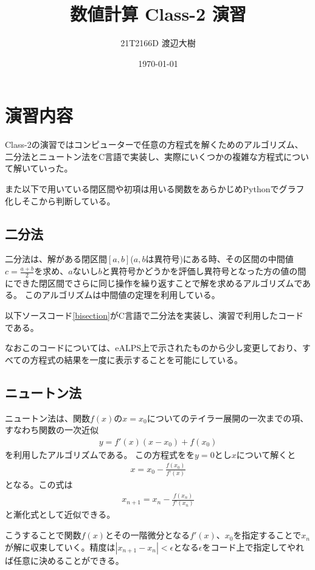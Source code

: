 \documentclass[a4paper,11pt]{jsarticle}
\begin{document}
\title{数値計算 Class-2 演習}
\author{21T2166D 渡辺大樹}
\date{\today}
\maketitle
\section{演習内容}
Class-2の演習ではコンピューターで任意の方程式を解くためのアルゴリズム、二分法とニュートン法をC言語で実装し、実際にいくつかの複雑な方程式について解いていった。

また以下で用いている閉区間や初項は用いる関数をあらかじめPythonでグラフ化しそこから判断している。
    \subsection{二分法}
    二分法は、解がある閉区間$[a,b]$($a,b$は異符号)にある時、その区間の中間値$c=\frac{a+b}{2}$を求め、$a$ないし$b$と異符号かどうかを評価し異符号となった方の値の間にできた閉区間でさらに同じ操作を繰り返すことで解を求めるアルゴリズムである。
    このアルゴリズムは中間値の定理を利用している。
    
    以下ソースコード\ref{bisection}がC言語で二分法を実装し、演習で利用したコードである。
    

    なおこのコードについては、eALPS上で示されたものから少し変更しており、すべての方程式の結果を一度に表示することを可能にしている。

    \subsection{ニュートン法}
    ニュートン法は、関数$f(x)$の$x=x_0$についてのテイラー展開の一次までの項、すなわち関数の一次近似
    \begin{align*}
    y=f'(x)(x-x_0)+f(x_0)
    \end{align*}
    を利用したアルゴリズムである。
    この方程式をを$y=0$とし$x$について解くと
    \begin{align*}
    x = x_0-\frac{f(x_0)}{f'(x)}
    \end{align*}
    となる。この式は
    \begin{align*}
    x_{n+1} = x_n-\frac{f(x_n)}{f'(x_n)}
    \end{align*}
    と漸化式として近似できる。
    
    こうすることで関数$f(x)$とその一階微分となる$f'(x)$、$x_0$を指定することで$x_n$が解に収束していく。精度は$|x_{n+1}-x_n| < \epsilon$となる$\epsilon$をコード上で指定してやれば任意に決めることができる。
    
\end{document}
